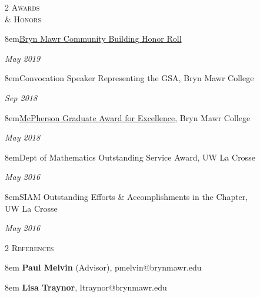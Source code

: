 \documentclass[11pt]{article}
\newcommand{\itemreg}[1]{\begin{addmargin}[0em]{8em} #1 \end{addmargin}}
\newcommand{\itemregdate}[2]{\begin{addmargin}[0em]{8em}#1\end{addmargin}\vspace{-1.5em}\hfill\textit{#2}\\ \vspace{.25em}}
\begin{document}
\clearpage

\begin{multicols}{2}
	\textsc{Awards \\ \& Honors}
	
	\columnbreak
	
	\itemregdate{\href{https://www.brynmawr.edu/president/presidential-initiatives/community-belonging/community-building-honor-roll}{Bryn Mawr Community Building Honor Roll}}{May 2019}
		\vspace{.35em}
	\itemregdate{Convocation Speaker Representing the GSA, Bryn Mawr College}{Sep 2018}
		\vspace{.35em}
	\itemregdate{\href{https://www.brynmawr.edu/president/mcpherson-award-excellence}{McPherson Graduate Award for Excellence}, Bryn Mawr College}{May 2018}
		\vspace{.35em}
	\itemregdate{Dept of Mathematics Outstanding Service Award, UW La Crosse}{May 2016}
		\vspace{.35em}
	\itemregdate{SIAM Outstanding Efforts \& Accomplishments in the Chapter, \\ UW La Crosse}{May 2016}
\end{multicols}
\vspace{-.5em}



\begin{multicols}{2}
	\textsc{References}
	
	\columnbreak
	
	\itemreg{\textbf{Paul Melvin} (Advisor), pmelvin@brynmawr.edu}
	\itemreg{\textbf{Lisa Traynor}, ltraynor@brynmawr.edu}
\end{multicols}


		
\end{document}
